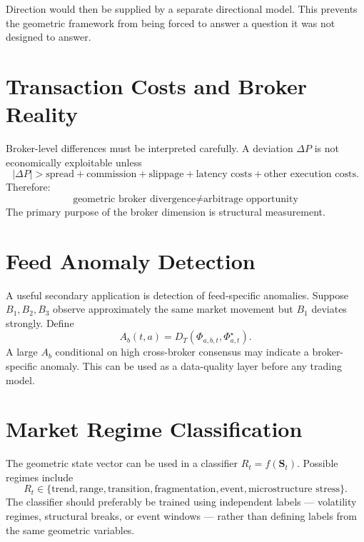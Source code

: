 \documentclass[11pt,a4paper]{article}
\numberwithin{equation}{section}
\newcommand{\abs}[1]{\left|#1\right|}
\begin{document}
Direction would then be supplied by a separate directional model.
This prevents the geometric framework from being forced to answer a
question it was not designed to answer.

\section{Transaction Costs and Broker Reality}

Broker-level differences must be interpreted carefully. A deviation
$\Delta P$ is not economically exploitable unless
\[
\abs{\Delta P}>
\text{spread}+\text{commission}+\text{slippage}
+\text{latency costs}+\text{other execution costs}.
\]
Therefore:
\[
\boxed{
\text{geometric broker divergence}\neq\text{arbitrage opportunity}
}
\]
The primary purpose of the broker dimension is structural
measurement.

\section{Feed Anomaly Detection}

A useful secondary application is detection of feed-specific
anomalies. Suppose $B_1,B_2,B_3$ observe approximately the same
market movement but $B_1$ deviates strongly. Define
\begin{equation}
A_b(t,a)=D_T(\Phi_{a,b,t},\Phi^\star_{a,t}).
\end{equation}
A large $A_b$ conditional on high cross-broker consensus may
indicate a broker-specific anomaly. This can be used as a
data-quality layer before any trading model.

\section{Market Regime Classification}

The geometric state vector can be used in a classifier
$R_t=f(\mathbf{S}_t)$. Possible regimes include
\[
R_t\in\{
\text{trend},\text{range},\text{transition},
\text{fragmentation},\text{event},
\text{microstructure stress}\}.
\]
The classifier should preferably be trained using independent labels
--- volatility regimes, structural breaks, or event windows ---
rather than defining labels from the same geometric variables.
\end{document}
